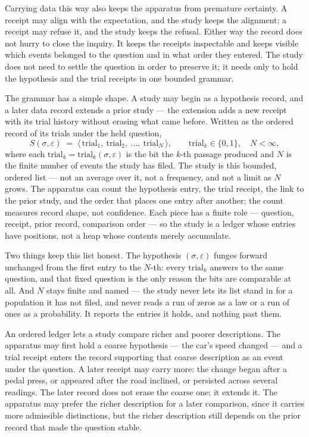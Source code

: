 Carrying data this way also keeps the apparatus from premature certainty. A receipt may align with the expectation, and the study keeps the alignment; a receipt may refuse it, and the study keeps the refusal. Either way the record does not hurry to close the inquiry. It keeps the receipts inspectable and keeps visible which events belonged to the question and in what order they entered. The study does not need to settle the question in order to preserve it; it needs only to hold the hypothesis and the trial receipts in one bounded grammar.

The grammar has a simple shape. A study may begin as a hypothesis record, and a later data record extends a prior study --- the extension adds a new receipt with its trial history without erasing what came before. Written as the ordered record of its trials under the held question,
\[ S(\sigma,\varepsilon) \;=\; \big\langle\, \mathrm{trial}_1,\ \mathrm{trial}_2,\ \dots,\ \mathrm{trial}_N \,\big\rangle, \qquad \mathrm{trial}_k \in \{0,1\}, \quad N < \infty, \]
where each $\mathrm{trial}_k = \mathrm{trial}_k(\sigma,\varepsilon)$ is the bit the $k$-th passage produced and $N$ is the finite number of events the study has filed. The study is this bounded, ordered list --- not an average over it, not a frequency, and not a limit as $N$ grows. The apparatus can count the hypothesis entry, the trial receipt, the link to the prior study, and the order that places one entry after another; the count measures record shape, not confidence. Each piece has a finite role --- question, receipt, prior record, comparison order --- so the study is a ledger whose entries have positions, not a heap whose contents merely accumulate.

Two things keep this list honest. The hypothesis $(\sigma,\varepsilon)$ funges forward unchanged from the first entry to the $N$-th: every $\mathrm{trial}_k$ answers to the same question, and that fixed question is the only reason the bits are comparable at all. And $N$ stays finite and named --- the study never lets its list stand in for a population it has not filed, and never reads a run of zeros as a law or a run of ones as a probability. It reports the entries it holds, and nothing past them.

An ordered ledger lets a study compare richer and poorer descriptions. The apparatus may first hold a coarse hypothesis --- the car's speed changed --- and a trial receipt enters the record supporting that coarse description as an event under the question. A later receipt may carry more: the change began after a pedal press, or appeared after the road inclined, or persisted across several readings. The later record does not erase the coarse one; it extends it. The apparatus may prefer the richer description for a later comparison, since it carries more admissible distinctions, but the richer description still depends on the prior record that made the question stable.

